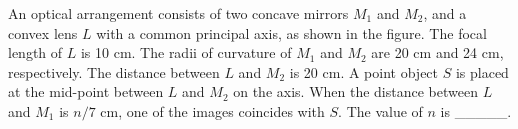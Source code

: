 \item An optical arrangement consists of two concave mirrors \( M_1 \) and \( M_2 \), and a convex lens \( L \) with a common principal axis, as shown in the figure. The focal length of \( L \) is 10 cm. The radii of curvature of \( M_1 \) and \( M_2 \) are 20 cm and 24 cm, respectively. The distance between \( L \) and \( M_2 \) is 20 cm. A point object \( S \) is placed at the mid-point between \( L \) and \( M_2 \) on the axis. When the distance between \( L \) and \( M_1 \) is \( n/7 \) cm, one of the images coincides with \( S \). The value of \( n \) is \_\_\_\_\_. 
    \begin{center}
    \end{center}

